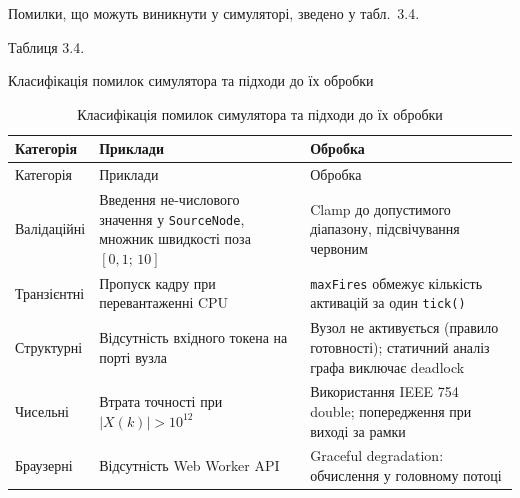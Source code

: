 Помилки, що можуть виникнути у симуляторі, зведено у табл.~3.4.

Таблиця 3.4.

Класифікація помилок симулятора та підходи до їх обробки

\begin{longtable}[]{@{}
  >{\raggedright\arraybackslash}p{}
  >{\raggedright\arraybackslash}p{}
  >{\raggedright\arraybackslash}p{}@{}}
\caption[Класифікація помилок симулятора]{Класифікація помилок симулятора
та підходи до їх обробки}\tabularnewline
\toprule\noalign{}
\begin{minipage}[b]{\linewidth}\raggedright
Категорія
\end{minipage} & \begin{minipage}[b]{\linewidth}\raggedright
Приклади
\end{minipage} & \begin{minipage}[b]{\linewidth}\raggedright
Обробка
\end{minipage} \\
\midrule\noalign{}
\endfirsthead
\toprule\noalign{}
\begin{minipage}[b]{\linewidth}\raggedright
Категорія
\end{minipage} & \begin{minipage}[b]{\linewidth}\raggedright
Приклади
\end{minipage} & \begin{minipage}[b]{\linewidth}\raggedright
Обробка
\end{minipage} \\
\midrule\noalign{}
\endhead
\bottomrule\noalign{}
\endlastfoot
Валідаційні & Введення не-числового значення у \texttt{SourceNode},
множник швидкості поза \([0{,}1;\,10]\) & Clamp до допустимого
діапазону, підсвічування червоним \\
Транзієнтні & Пропуск кадру при перевантаженні CPU & \texttt{maxFires}
обмежує кількість активацій за один \texttt{tick()} \\
Структурні & Відсутність вхідного токена на порті вузла & Вузол не
активується (правило готовності); статичний аналіз графа виключає
deadlock \\
Чисельні & Втрата точності при \(|X(k)|>10^{12}\) & Використання IEEE
754 double; попередження при виході за рамки \\
Браузерні & Відсутність Web Worker API & Graceful degradation:
обчислення у головному потоці \\
\end{longtable}

